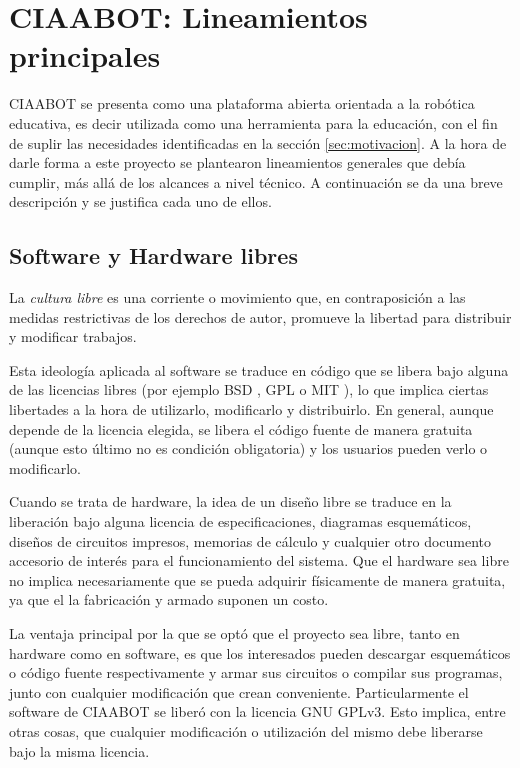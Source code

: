 \section{CIAABOT: Lineamientos principales}
\label{sec:ciaabot:lineamientos}
CIAABOT se presenta como una plataforma abierta orientada a la robótica educativa, es decir utilizada como una herramienta para la educación, con el fin de suplir las necesidades identificadas en la sección \ref{sec:motivacion}. A la hora de darle forma a este proyecto se plantearon lineamientos generales que debía cumplir, más allá de los alcances a nivel técnico. A continuación se da una breve descripción y se justifica cada uno de ellos.

\subsection{Software y Hardware libres}
\label{subsec:sotwareLibre}
La \emph{cultura libre} es una corriente o movimiento que, en contraposición a las medidas restrictivas de los derechos de autor, promueve la libertad para distribuir y modificar trabajos.

Esta ideología aplicada al software se traduce en código que se libera bajo alguna de las licencias libres (por ejemplo BSD \citep{BSD}, GPL \citep{GPLv3} o MIT \citep{MIT}), lo que implica ciertas libertades a la hora de utilizarlo, modificarlo y distribuirlo. En general, aunque depende de la licencia elegida, se libera el código fuente de manera gratuita (aunque esto último no es condición obligatoria) y los usuarios pueden verlo o modificarlo.

Cuando se trata de hardware, la idea de un diseño libre se traduce en la liberación bajo alguna licencia de especificaciones, diagramas esquemáticos, diseños de circuitos impresos, memorias de cálculo y cualquier otro documento accesorio de interés para el funcionamiento del sistema. Que el hardware sea libre no implica necesariamente que se pueda adquirir físicamente de manera gratuita, ya que el la fabricación y armado suponen un costo. 

La ventaja principal por la que se optó que el proyecto sea libre, tanto en hardware como en software, es que los interesados pueden descargar esquemáticos o código fuente respectivamente y armar sus circuitos o compilar sus programas, junto con cualquier modificación que crean conveniente. Particularmente el software de CIAABOT se liberó con la licencia GNU GPLv3. Esto implica, entre otras cosas, que cualquier modificación o utilización del mismo debe liberarse bajo la misma licencia.


